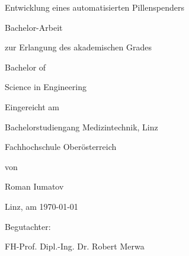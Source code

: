 \documentclass[12pt,a4paper]{article}
\begin{document}
	
	\begin{titlepage}
		\centering
		
		\vspace*{4cm} %
		
		{\fontsize{24pt}{30pt}\selectfont Entwicklung eines automatisierten Pillenspenders\par} %
		
		\vspace{1cm}
		
		{\fontsize{16pt}{20pt}\selectfont Bachelor-Arbeit\par} %
		
		\vspace{2cm}
		
		{\fontsize{12pt}{16pt}\selectfont zur Erlangung des akademischen Grades\par} %
		{\fontsize{12pt}{16pt}\selectfont Bachelor of\par} %
		{\fontsize{12pt}{16pt}\selectfont Science in Engineering\par} %
		
		\vspace{2cm}
		
		{\fontsize{12pt}{16pt}\selectfont Eingereicht am\par} %
		{\fontsize{12pt}{16pt}\selectfont Bachelorstudiengang Medizintechnik, Linz\par} %
		{\fontsize{12pt}{16pt}\selectfont Fachhochschule Oberösterreich\par} %
		
		\vspace{2cm}
		
		{\fontsize{12pt}{16pt}\selectfont von\par} %
		{\fontsize{14pt}{18pt}\selectfont Roman Iumatov\par} %
		
		\vspace{2cm}
		
		{\fontsize{12pt}{16pt}\selectfont Linz, am \today \par} %
		
		\vfill %
		
		\vspace{1cm} %
		
		{\fontsize{12pt}{16pt}\selectfont Begutachter:\par} %
		{\fontsize{12pt}{16pt}\selectfont FH-Prof. Dipl.-Ing. Dr. Robert Merwa\par} %
		
		
	\end{titlepage}
\end{document}
